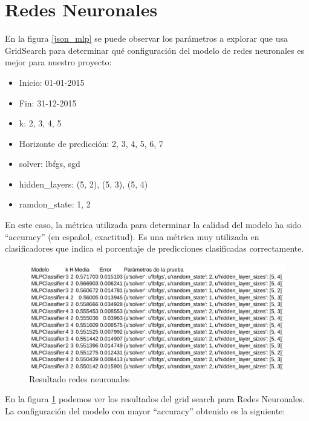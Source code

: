 
\section{Redes Neuronales}
\label{makereference7.3}

En la figura \ref{json_mlp} se puede observar los parámetros a explorar que usa GridSearch para determinar qué configuración del modelo de redes neuronales es mejor para nuestro proyecto:

\begin{itemize}
\item Inicio: 01-01-2015
\item Fin: 31-12-2015
\item k: 2, 3, 4, 5
\item Horizonte de predicción: 2, 3, 4, 5, 6, 7
\item solver: lbfgs, sgd
\item hidden\_layers: (5, 2), (5, 3), (5, 4)
\item ramdon\_state: 1, 2
\end{itemize}

En este caso, la métrica utilizada para determinar la calidad del modelo ha sido ``accuracy'' (en español, exactitud). Es una métrica muy utilizada en clasificadores que indica el porcentaje de predicciones clasificadas correctamente.

\begin{figure}[htb]
	\begin{center}
		\includegraphics[width=14cm]{figures/resultado_mlp.png}
		\caption{Resultado redes neuronales \label{resultado_mlp}}
	\end{center}
\end{figure}

En la figura \ref{resultado_mlp} podemos ver los resultados del grid search para Redes Neuronales. La configuración del modelo con mayor ``accuracy'' obtenido es la siguiente:

